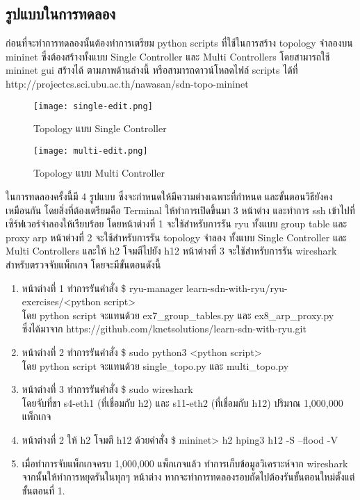 \subsection{รูปแบบในการทดลอง}
\indent\indent
ก่อนที่จะทำการทดลองนั้นต้องทำการเตรียม python scripts ที่ใช้ในการสร้าง topology จำลองบน mininet
ซึ่งต้องสร้างทั้งแบบ Single Controller และ Multi Controllers โดยสามารถใช้ mininet gui สร้างได้ ตามภาพด้านล่างนี้
หรือสามารถดาวน์โหลดไฟล์ scripts ได้ที่ http://projectcs.sci.ubu.ac.th/nawasan/sdn-topo-mininet
\\
\begin{figure}[h!]
    \centering
    \texttt{[image: single-edit.png]}
    \caption{Topology แบบ Single Controller}
    \label{img:topo_cs}
\end{figure}

\begin{figure}[h!]
    \centering
    \texttt{[image: multi-edit.png]}
    \caption{Topology แบบ Multi Controller}
    \label{img:topo_cm}
\end{figure}

ในการทดลองครั้งนี้มี 4 รูปแบบ ซึ่งจะกำหนดให้มีความต่างเฉพาะที่กำหนด และขั้นตอนวิธียังคงเหมือนกัน
โดยสิ่งที่ต้องเตรียมคือ Terminal ให้ทำการเปิดขึ้นมา 3 หน้าต่าง และทำการ ssh เข้าไปที่เซิร์ฟเวอร์จำลองให้เรียบร้อย 
โดยหน้าต่างที่ 1 จะใช้สำหรับการรัน \gls{ryu} ทั้งแบบ group table และ proxy arp 
หน้าต่างที่ 2 จะใช้สำหรับการรัน topology จำลอง ทั้งแบบ Single Controller และ Multi Controllers 
และให้ h2 โจมตีไปยัง h12
หน้าต่างที่ 3 จะใช้สำหรับการรัน wireshark สำหรับตรวจจับแพ็กเกจ
โดยจะมีขั้นตอนดังนี้

\begin{enumerate}
    \item หน้าต่างที่ 1 ทำการรันคำสั่ง
    \$ ryu-manager learn-sdn-with-ryu/ryu-exercises/<python script> \\โดย python script จะแทนด้วย ex7\_group\_tables.py และ ex8\_arp\_proxy.py 
    \\ซึ่งได้มาจาก https://github.com/knetsolutions/learn-sdn-with-ryu.git
    \item หน้าต่างที่ 2 ทำการรันคำสั่ง
    \$ sudo python3 <python script> \\
    โดย python script จะแทนด้วย single\_topo.py และ multi\_topo.py 
    \item หน้าต่างที่ 3 ทำการรันคำสั่ง
    \$ sudo wireshark \\
    โดยจับที่ขา s4-eth1 (ที่เชื่อมกับ h2) และ s11-eth2 (ที่เชื่อมกับ h12) ปริมาณ 1,000,000 แพ็กเกจ
    \item หน้าต่างที่ 2 ให้ h2 โจมตี h12 ด้วยคำสั่ง \$ mininet> h2 hping3 h12 -S --flood -V
    \item เมื่อทำการจับแพ็กเกจครบ 1,000,000 แพ็กเกจแล้ว ทำการเก็บข้อมูลวิเคราะห์จาก wireshark จากนั้นให้ทำการหยุดรันในทุกๆ หน้าต่าง หากจะทำการทดลองรอบถัดไปต้องรันขั้นตอนใหม่ตั้งแต่ขั้นตอนที่ 1.
\end{enumerate}

